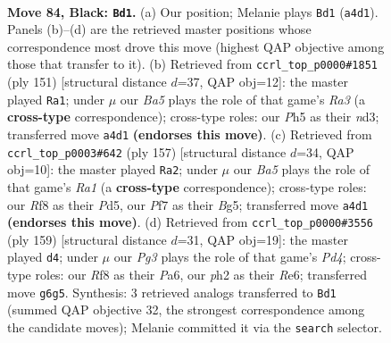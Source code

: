 \documentclass[11pt]{article}
\begin{document}
\clearpage

\begin{figure}[p]\centering
\begin{subfigure}{0.46\textwidth}\centering
\resizebox{\linewidth}{!}{%
\newchessgame
\chessboard[
  setfen={5r2/5p2/n5p1/4P2p/b1k2Pp1/8/4N2P/1B4K1 b - - 27 84},
  showmover=false,
  pgfstyle=straightmove, color=movearrow, markmove={a4-d1}
]}
\caption{}
\end{subfigure}\hfill
\begin{subfigure}{0.46\textwidth}\centering
\resizebox{\linewidth}{!}{%
\newchessgame
\chessboard[
  setfen={8/4kp2/r3p3/3p2P1/3P2B1/3NPK2/8/8 b - - 10 76},
  showmover=false,
  pgfstyle=straightmove, color=movearrow, markmove={a6-a1}
]}
\caption{}
\end{subfigure}
\\[4pt]
\begin{subfigure}{0.46\textwidth}\centering
\resizebox{\linewidth}{!}{%
\newchessgame
\chessboard[
  setfen={r4k2/1p6/2p5/2Pp2b1/3P2N1/3K4/5p1P/3R1B2 b - - 15 79},
  showmover=false,
  pgfstyle=straightmove, color=movearrow, markmove={a8-a2}
]}
\caption{}
\end{subfigure}\hfill
\begin{subfigure}{0.46\textwidth}\centering
\resizebox{\linewidth}{!}{%
\newchessgame
\chessboard[
  setfen={6k1/1p6/p1p1r3/3p3R/5B2/1P4PK/P7/8 b - - 0 80},
  showmover=false,
  pgfstyle=straightmove, color=movearrow, markmove={d5-d4}
]}
\caption{}
\end{subfigure}
\caption{\textbf{Move 84, Black: \texttt{Bd1}.} (a) Our position; Melanie plays \texttt{Bd1} (\texttt{a4d1}). Panels (b)--(d) are the retrieved master positions whose correspondence most drove this move (highest QAP objective among those that transfer to it). (b) Retrieved from \texttt{ccrl\_top\_p0000\#1851} (ply 151) [structural distance $d$=37, QAP obj=12]: the master played \texttt{Ra1}; under $\mu$ our \emph{Ba5} plays the role of that game's \emph{Ra3} (a \textbf{cross-type} correspondence); cross-type roles: our \emph{P}h5 as their \emph{n}d3; transferred move \texttt{a4d1} \textbf{(endorses this move)}. (c) Retrieved from \texttt{ccrl\_top\_p0003\#642} (ply 157) [structural distance $d$=34, QAP obj=10]: the master played \texttt{Ra2}; under $\mu$ our \emph{Ba5} plays the role of that game's \emph{Ra1} (a \textbf{cross-type} correspondence); cross-type roles: our \emph{R}f8 as their \emph{P}d5, our \emph{P}f7 as their \emph{B}g5; transferred move \texttt{a4d1} \textbf{(endorses this move)}. (d) Retrieved from \texttt{ccrl\_top\_p0000\#3556} (ply 159) [structural distance $d$=31, QAP obj=19]: the master played \texttt{d4}; under $\mu$ our \emph{Pg3} plays the role of that game's \emph{Pd4}; cross-type roles: our \emph{R}f8 as their \emph{P}a6, our \emph{p}h2 as their \emph{R}e6; transferred move \texttt{g6g5}. Synthesis: 3 retrieved analogs transferred to \texttt{Bd1} (summed QAP objective 32, the strongest correspondence among the candidate moves); Melanie committed it via the \texttt{search} selector.}
\label{fig:thought-m167}
\end{figure}
\end{document}
